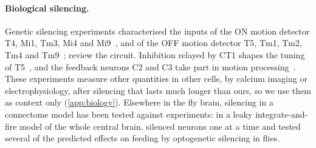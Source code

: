 \paragraph{Biological silencing.}
Genetic silencing experiments characterised the inputs of the ON motion detector T4, Mi1, Tm3, Mi4 and Mi9~\citep{ammer2015functional,strother2017emergence}, and of the OFF motion detector T5, Tm1, Tm2, Tm4 and Tm9~\citep{serbe2016comprehensive}; \citet{borst2020fly} review the circuit. Inhibition relayed by CT1 shapes the tuning of T5~\citep{braun2023disynaptic}, and the feedback neurons C2 and C3 take part in motion processing~\citep{henning2026inhibitory}. These experiments measure other quantities in other cells, by calcium imaging or electrophysiology, after silencing that lasts much longer than ours, so we use them as context only (\cref{app:biology}). Elsewhere in the fly brain, silencing in a connectome model has been tested against experiments: in a leaky integrate-and-fire model of the whole central brain, \citet{shiu2024drosophila} silenced neurons one at a time and tested several of the predicted effects on feeding by optogenetic silencing in flies.
